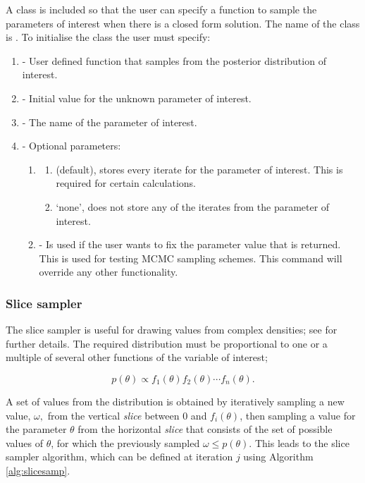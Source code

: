 \documentclass[article]{jss}
\begin{document}
A class is included so that the user can specify a function to sample
the parameters of interest when there is a closed form solution. The
name of the class is . To initialise the class the
user must specify:
\begin{enumerate}
\item {} - User defined function that samples from the
  posterior distribution of interest.
\item {} - Initial value for the unknown parameter of
  interest.
\item {} - The name of the parameter of interest.
\item {} - Optional parameters:

\begin{enumerate}
\item {}
  \begin{enumerate}
  \item {} (default), stores every iterate for the parameter
    of interest. This is required for certain calculations.
  \item `none', does not store any of the iterates from the parameter
    of interest.
  \end{enumerate}
\item {} - Is used if the user wants to fix the
  parameter value that is returned. This is used for testing MCMC
  sampling schemes.  This command will override any other
  functionality.
\end{enumerate}
\end{enumerate}

\subsubsection{Slice sampler}

The slice sampler is useful for drawing values from complex densities;
see \citet{Radford2003} for further details. The required distribution
must be proportional to one or a multiple of several other functions
of the variable of interest;

\[p(\theta)\propto f_{1}(\theta)f_{2}(\theta)\cdots f_{n}(\theta).\]

A set of values from the distribution is obtained by iteratively
sampling a new value, $\omega,$ from the vertical \emph{slice} between
0 and $f_{i}(\theta)$, then sampling a value for the parameter
$\theta$ from the horizontal \emph{slice} that consists of the set of
possible values of $\theta$, for which the previously sampled
$\omega\le p(\theta)$.  This leads to the slice sampler algorithm,
which can be defined at iteration $j$ using Algorithm
\ref{alg:slicesamp}.
\end{document}
